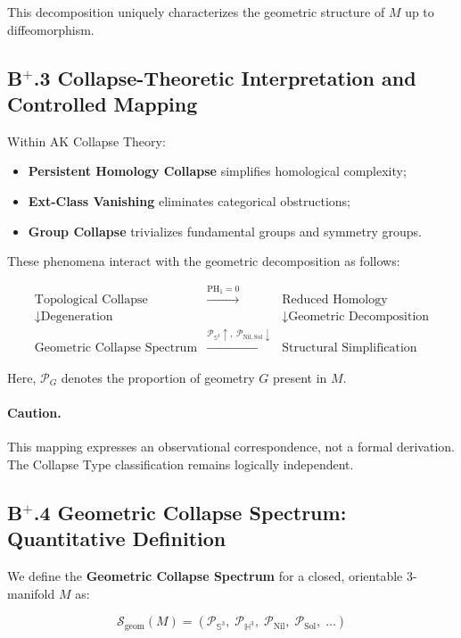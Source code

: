 \documentclass[11pt]{article}
\begin{document}
This decomposition uniquely characterizes the geometric structure of $M$ up to diffeomorphism.

\subsection*{B$^{+}$.3 Collapse-Theoretic Interpretation and Controlled Mapping}

Within AK Collapse Theory:

\begin{itemize}
    \item \textbf{Persistent Homology Collapse} simplifies homological complexity;
    \item \textbf{Ext-Class Vanishing} eliminates categorical obstructions;
    \item \textbf{Group Collapse} trivializes fundamental groups and symmetry groups.
\end{itemize}

These phenomena interact with the geometric decomposition as follows:

\[
\begin{array}{ccc}
\text{Topological Collapse} & \xrightarrow{\mathrm{PH}_1 = 0} & \text{Reduced Homology} \\
\downarrow \text{Degeneration} & & \downarrow \text{Geometric Decomposition} \\
\text{Geometric Collapse Spectrum} & \xrightarrow{\mathcal{P}_{\mathbb{S}^3} \uparrow,\;\mathcal{P}_{\mathrm{Nil},\mathrm{Sol}} \downarrow} & \text{Structural Simplification}
\end{array}
\]

Here, $\mathcal{P}_G$ denotes the proportion of geometry $G$ present in $M$.

\paragraph{Caution.} This mapping expresses an observational correspondence, not a formal derivation. The Collapse Type classification remains logically independent.

\subsection*{B$^{+}$.4 Geometric Collapse Spectrum: Quantitative Definition}

We define the \textbf{Geometric Collapse Spectrum} for a closed, orientable $3$-manifold $M$ as:

\[
\mathcal{S}_{\mathrm{geom}}(M) = \left( \mathcal{P}_{\mathbb{S}^3},\; \mathcal{P}_{\mathbb{H}^3},\; \mathcal{P}_{\mathrm{Nil}},\; \mathcal{P}_{\mathrm{Sol}},\; \ldots \right)
\]
\end{document}
